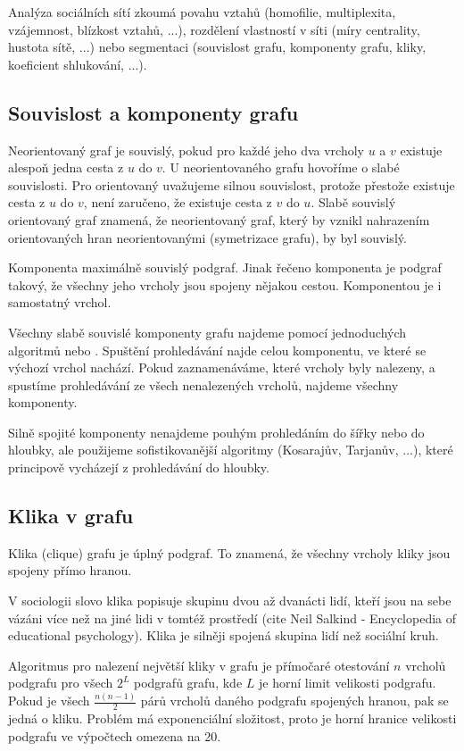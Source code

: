 \documentclass{bakalarka}
\begin{document}
Analýza sociálních sítí zkoumá povahu vztahů (homofilie, multiplexita,
vzájemnost, blízkost vztahů, ...), rozdělení vlastností v síti (míry
centrality, hustota sítě, ...) nebo segmentaci (souvislost grafu, komponenty
grafu, kliky, koeficient shlukování, ...).

\subsection{Souvislost a komponenty grafu}
Neorientovaný graf je souvislý, pokud pro každé jeho dva vrcholy $u$ a $v$
existuje alespoň jedna cesta z $u$ do $v$. U neorientovaného grafu hovoříme o
slabé souvislosti. Pro orientovaný uvažujeme silnou souvislost, protože
přestože existuje cesta z $u$ do $v$, není zaručeno, že existuje cesta z $v$ do
$u$.  Slabě souvislý orientovaný graf znamená, že neorientovaný graf, který by
vznikl nahrazením orientovaných hran neorientovanými (symetrizace grafu), by
byl souvislý.

Komponenta maximálně souvislý podgraf. Jinak řečeno komponenta je podgraf
takový, že všechny jeho vrcholy jsou spojeny nějakou cestou. Komponentou je i
samostatný vrchol.

Všechny slabě souvislé komponenty grafu najdeme pomocí jednoduchých algoritmů
 nebo . Spuštění prohledávání najde
celou komponentu, ve které se výchozí vrchol nachází. Pokud zaznamenáváme,
které vrcholy byly nalezeny, a spustíme prohledávání ze všech nenalezených
vrcholů, najdeme všechny komponenty. 

Silně spojité komponenty nenajdeme pouhým prohledáním do šířky nebo do hloubky,
ale použijeme sofistikovanější algoritmy (Kosarajův, Tarjanův, ...), které
principově vycházejí z prohledávání do hloubky.

\subsection{Klika v grafu}
Klika (clique) grafu je úplný podgraf. To znamená, že všechny vrcholy kliky
jsou spojeny přímo hranou.

V sociologii slovo klika popisuje skupinu dvou až dvanácti lidí, kteří jsou na
sebe vázáni více než na jiné lidi v tomtéž prostředí (cite Neil Salkind -
Encyclopedia of educational psychology). Klika je silněji spojená skupina lidí
než sociální kruh.

Algoritmus pro nalezení největší kliky v grafu je přímočaré otestování $n$
vrcholů podgrafu pro všech $2^L$ podgrafů grafu, kde $L$ je horní limit
velikosti podgrafu. Pokud je všech $\frac{n(n - 1)}{2}$ párů vrcholů daného
podgrafu spojených hranou, pak se jedná o kliku. Problém má exponenciální
složitost, proto je horní hranice velikosti podgrafu ve výpočtech omezena na
20.
\end{document}
